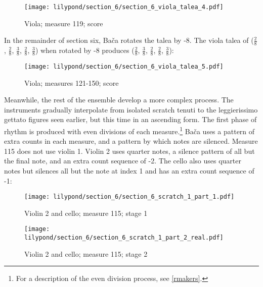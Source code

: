\setcounter{figure}{33}
\begin{figure}[H]
    \texttt{[image: lilypond/section\_6/section\_6\_viola\_talea\_4.pdf]}
     \caption{Viola; measure 119; score}
    \label{fig:section-6-talea-4}
\end{figure}

In the remainder of section six, Bača rotates the talea by -8. The viola talea of ($\frac{2}{8}$, $\frac{2}{8}$, $\frac{3}{8}$, $\frac{2}{8}$, $\frac{3}{8}$) when rotated by -8 produces ($\frac{2}{8}$, $\frac{3}{8}$, $\frac{2}{8}$, $\frac{2}{8}$, $\frac{3}{8}$):

\setcounter{figure}{34}
\begin{figure}[H]
    \texttt{[image: lilypond/section\_6/section\_6\_viola\_talea\_5.pdf]}
    \caption{Viola; measures 121-150; score}
    \label{fig:section-6-talea-5}
\end{figure}


Meanwhile, the rest of the ensemble develop a more complex process. The instruments gradually interpolate from isolated scratch tenuti to the leggierissimo gettato figures seen earlier, but this time in an ascending form. The first phase of rhythm is produced with even divisions of each measure.\footnote{For a description of the even division process, see \vref{rmakers}.} Bača uses a pattern of extra counts in each measure, and a pattern by which notes are silenced. Measure 115 does not use violin 1. Violin 2 uses quarter notes, a silence pattern of all but the final note, and an extra count sequence of -2. The cello also uses quarter notes but silences all but the note at index 1 and has an extra count sequence of -1:

\setcounter{figure}{35}
\setcounter{subFigure}{1}
\renewcommand{\thefigure}{\thechapter.\arabic{figure}.\alph{subFigure}}
\begin{figure}[H]
    \texttt{[image: lilypond/section\_6/section\_6\_scratch\_1\_part\_1.pdf]}
    \caption{Violin 2 and cello; measure 115; stage 1}
    \label{fig:section-6-scratch-1-1}
\end{figure}

\setcounter{figure}{35}
\setcounter{subFigure}{2}
\begin{figure}[H]
    \texttt{[image: lilypond/section\_6/section\_6\_scratch\_1\_part\_2\_real.pdf]}
    \caption{Violin 2 and cello; measure 115; stage 2}
    \label{fig:section-6-scratch-1-2}
\end{figure}

